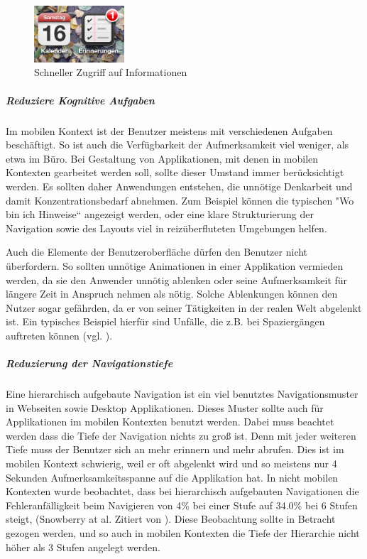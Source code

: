 \begin{figure}
	\begin{center}
	
	\includegraphics[width=0.3\textwidth]{img/iconIos.png}
	\caption{Schneller Zugriff auf Informationen}\label{fig:iconIos}
\end{center}
\end{figure}

\subparagraph{Reduziere Kognitive Aufgaben} 
\label{subp:reduziere_kognitive_aufgaben_}

Im mobilen Kontext ist der Benutzer meistens mit verschiedenen Aufgaben beschäftigt. So ist auch die Verfügbarkeit der Aufmerksamkeit viel weniger, als etwa im Büro. Bei Gestaltung von Applikationen, mit denen in mobilen Kontexten gearbeitet werden soll, sollte dieser Umstand immer berücksichtigt werden. Es sollten daher Anwendungen entstehen, die unnötige Denkarbeit und damit Konzentrationsbedarf abnehmen. Zum Beispiel können die typischen "Wo bin ich Hinweise“ angezeigt werden, oder eine klare Strukturierung der Navigation sowie des Layouts viel in reizüberfluteten Umgebungen helfen. 

Auch die Elemente der Benutzeroberfläche dürfen den Benutzer nicht überfordern. So sollten unnötige Animationen in einer Applikation vermieden werden, da sie den Anwender unnötig ablenken oder seine Aufmerksamkeit für längere Zeit in Anspruch nehmen als nötig. Solche Ablenkungen können den Nutzer sogar gefährden, da er von seiner Tätigkeiten in der realen Welt abgelenkt ist. Ein typisches Beispiel hierfür sind Unfälle, die z.B. bei Spaziergängen auftreten können (vgl. \cite{Nasar:2008cc}).

\subparagraph{Reduzierung der Navigationstiefe} 
\label{subp:reduziere_das_w_hlen}

Eine hierarchisch aufgebaute Navigation ist ein viel benutztes Navigationsmuster in Webseiten sowie Desktop Applikationen. Dieses Muster sollte auch für Applikationen im mobilen Kontexten benutzt werden. Dabei muss beachtet werden dass die Tiefe der Navigation nichts zu groß ist. Denn mit jeder weiteren Tiefe muss der Benutzer sich an mehr erinnern und mehr abrufen. Dies ist im mobilen Kontext schwierig, weil er oft abgelenkt wird und so meistens nur 4 Sekunden Aufmerksamkeitsspanne auf die Applikation hat\cite{Oulasvirta:2005vn}. In nicht mobilen Kontexten wurde beobachtet, dass bei hierarchisch aufgebauten Navigationen die Fehleranfälligkeit beim Navigieren von 4\% bei einer Stufe auf 34.0\% bei 6 Stufen steigt, (Snowberry at al. Zitiert von \cite{Chae:2004gp}). Diese Beobachtung sollte in Betracht gezogen werden, und so auch in mobilen Kontexten die Tiefe der Hierarchie nicht höher als 3 Stufen angelegt werden.

